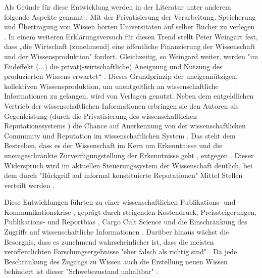 Als Gründe für diese Entwicklung werden in der Literatur unter anderem folgende Aspekte genannt \cite{suchen}: Mit der Privatisierung der Verarbeitung, Speicherung und Übertragung von Wissen hörten Universitäten auf selber Bücher zu verlegen \cite{cite:0}. In einem weiteren Erklärungsversuch für diesen Trend stellt Peter Weingart fest, dass „die Wirtschaft (zunehmend) eine öffentliche Finanzierung der Wissenschaft und der Wissensproduktion" fordert. Gleichzeitig, so Weingard weiter, werden "im Endeffekt (...) die privat(-wirtschaftliche) Aneignung und Nutzung des produzierten Wissens erwartet“ \cite{cite:2}. Dieses Grundprinzip der uneigennützigen, kollektiven Wissensproduktion, um unentgeltlich an wissenschaftliche Informationen zu gelangen, wird von Verlagen genutzt. Neben dem entgeldlichen Vertrieb der wissenschaftlichen Informationen erbringen sie den Autoren als Gegenleistung (durch die Privatisierung des wissenschafltichen Reputationssystems \cite{suchen}) die Chance auf Anerkennung von der wissenschaftlichen Community und Reputation im wissenschaftlichen System \cite{cite:21a}. Das steht dem Bestreben, dass es der Wissenschaft im Kern um Erkenntnisse und die uneingeschränkte Zurverfügungstellung der Erkenntnisse geht \cite{hanekop_2006}, entgegen \cite{offhaus_2012_institutionelle_repos}. Dieser Widerspruch wird im aktuellen Steuerungssystem der Wissenschaft deutlich, bei dem durch "Rückgriff auf informal konstituierte Reputationen" \cite{luhmann_1970_selbststeuerung} Mittel Stellen verteilt werden \cite{cite:4}.

Diese Entwicklungen führten zu einer wissenschaftlichen Publikations- und Kommunikationskrise \cite{suchen}, geprägt durch steigenden Kostendruck, Preissteigerungen, Publikations- \cite{Egger_1997} \cite{Fanelli_2012} und Reportbias \cite{Chan_2008} \cite{Dickersin_2011} , Cargo Cult Science \cite{Feynman_1974} und die Einschränkung des Zugriffs auf wissenschaftliche Informationen \cite{Hess_2006}. Darüber hinaus wächst die Besorgnis, dass es zunehmend wahrscheinlicher ist, dass die meisten veröffentlichten Forschungsergebnisse "eher falsch als richtig sind" \cite{Ioannidis_2005}. Da jede Beschränkung des Zugangs zu Wissen auch die Erstellung neuen Wissen behindert \cite{cite:5} \cite{cite:8} \cite{Luhmann1998} ist dieser "Schwebezustand unhaltbar" \cite{suchen}. 

